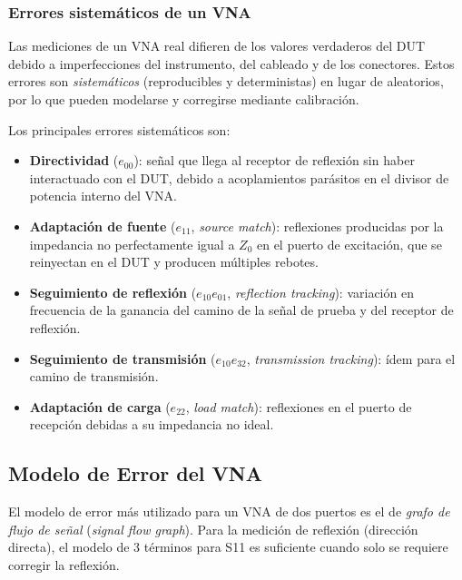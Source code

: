 \subsubsection{Errores sistemáticos de un VNA}

Las mediciones de un VNA real difieren de los valores verdaderos del DUT debido
a imperfecciones del instrumento, del cableado y de los conectores. Estos
errores son \emph{sistemáticos} (reproducibles y deterministas) en lugar de
aleatorios, por lo que pueden modelarse y corregirse mediante calibración.

Los principales errores sistemáticos son:

\begin{itemize}
    \item \textbf{Directividad} ($e_{00}$): señal que llega al receptor de
          reflexión sin haber interactuado con el DUT, debido a acoplamientos
          parásitos en el divisor de potencia interno del VNA.
    \item \textbf{Adaptación de fuente} ($e_{11}$, \emph{source match}):
          reflexiones producidas por la impedancia no perfectamente igual a
          $Z_0$ en el puerto de excitación, que se reinyectan en el DUT y
          producen múltiples rebotes.
    \item \textbf{Seguimiento de reflexión} ($e_{10}e_{01}$,
          \emph{reflection tracking}): variación en frecuencia de la ganancia
          del camino de la señal de prueba y del receptor de reflexión.
    \item \textbf{Seguimiento de transmisión} ($e_{10}e_{32}$,
          \emph{transmission tracking}): ídem para el camino de transmisión.
    \item \textbf{Adaptación de carga} ($e_{22}$, \emph{load match}):
          reflexiones en el puerto de recepción debidas a su impedancia no
          ideal.
\end{itemize}

\newpage
\Encabezado

\subsection{Modelo de Error del VNA}
\label{sec:modelo_error}

El modelo de error más utilizado para un VNA de dos puertos es el de
\emph{grafo de flujo de señal} (\emph{signal flow graph}). Para la medición
de reflexión (dirección directa), el modelo de 3 términos para S11 es
suficiente cuando solo se requiere corregir la reflexión.

